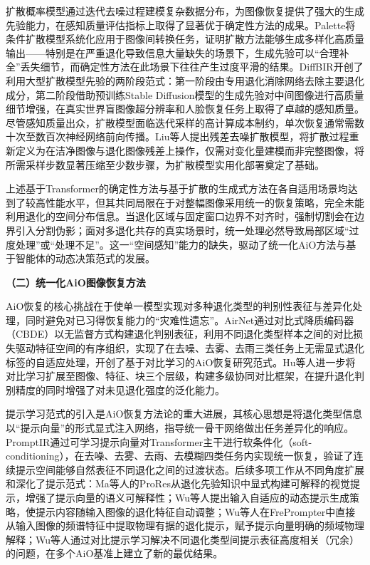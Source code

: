 扩散概率模型通过迭代去噪过程建模复杂数据分布，为图像恢复提供了强大的生成先验能力，在感知质量评估指标上取得了显著优于确定性方法的成果。Palette\cite{palette}将条件扩散模型系统化应用于图像间转换任务，证明扩散方法能够生成多样化高质量输出——特别是在严重退化导致信息大量缺失的场景下，生成先验可以“合理补全”丢失细节，而确定性方法在此场景下往往产生过度平滑的结果。DiffBIR\cite{diffbir}开创了利用大型扩散模型先验的两阶段范式：第一阶段由专用退化消除网络去除主要退化成分，第二阶段借助预训练Stable Diffusion模型的生成先验对中间图像进行高质量细节增强，在真实世界盲图像超分辨率和人脸恢复任务上取得了卓越的感知质量。尽管感知质量出众，扩散模型面临迭代采样的高计算成本制约，单次恢复通常需数十次至数百次神经网络前向传播。Liu等人\cite{rddm}提出残差去噪扩散模型，将扩散过程重新定义为在洁净图像与退化图像残差上操作，仅需对变化量建模而非完整图像，将所需采样步数显著压缩至少数步骤，为扩散模型实用化部署奠定了基础。

上述基于Transformer的确定性方法与基于扩散的生成式方法在各自适用场景均达到了较高性能水平，但其共同局限在于对整幅图像采用统一的恢复策略，完全未能利用退化的空间分布信息。当退化区域与固定窗口边界不对齐时，强制切割会在边界引入分割伪影；面对多退化共存的真实场景时，统一处理必然导致局部区域“过度处理”或“处理不足”。这一“空间感知”能力的缺失，驱动了统一化AiO方法与基于智能体的动态决策范式的发展。

\textbf{（二）统一化AiO图像恢复方法}

AiO恢复的核心挑战在于使单一模型实现对多种退化类型的判别性表征与差异化处理，同时避免对已习得恢复能力的“灾难性遗忘”。AirNet\cite{airnet}通过对比式降质编码器（CBDE）以无监督方式构建退化判别表征，利用不同退化类型样本之间的对比损失驱动特征空间的有序组织，实现了在去噪、去雾、去雨三类任务上无需显式退化标签的自适应处理，开创了基于对比学习的AiO恢复研究范式。Hu等人\cite{hu2025collab}进一步将对比学习扩展至图像、特征、块三个层级，构建多级协同对比框架，在提升退化判别精度的同时增强了对未见退化强度的泛化能力。

提示学习范式的引入是AiO恢复方法论的重大进展，其核心思想是将退化类型信息以“提示向量”的形式显式注入网络，指导统一骨干网络做出任务差异化的响应。PromptIR\cite{promptir}通过可学习提示向量对Transformer主干进行软条件化（soft-conditioning），在去噪、去雾、去雨、去模糊四类任务内实现统一恢复，验证了连续提示空间能够自然表征不同退化之间的过渡状态。后续多项工作从不同角度扩展和深化了提示范式：Ma等人\cite{prores}的ProRes从退化先验知识中显式构建可解释的视觉提示，增强了提示向量的语义可解释性；Wu等人\cite{wu2025dynamic}提出输入自适应的动态提示生成策略，使提示内容随输入图像的退化特征自动调整；Wu等人\cite{wu2024freq}在FrePrompter中直接从输入图像的频谱特征中提取物理有据的退化提示，赋予提示向量明确的频域物理解释；Wu等人\cite{wu2025beyond}通过对比提示学习解决不同退化类型间提示表征高度相关（冗余）的问题，在多个AiO基准上建立了新的最优结果。

